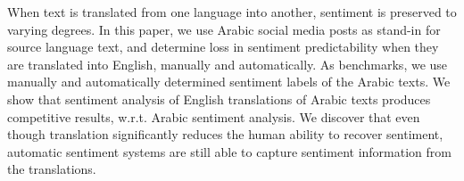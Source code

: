 When text is translated from one language into another, sentiment is preserved to varying degrees. In this paper, we use Arabic social media posts as stand-in for source language text, and determine loss in sentiment predictability when they are translated into English, manually and automatically. As benchmarks, we use manually and automatically determined sentiment labels of the Arabic texts. We show that sentiment analysis of English translations of Arabic texts produces competitive results, w.r.t. Arabic sentiment analysis. We discover that even though translation significantly reduces the human ability to recover sentiment, automatic sentiment systems are still able to capture sentiment information from the translations.
